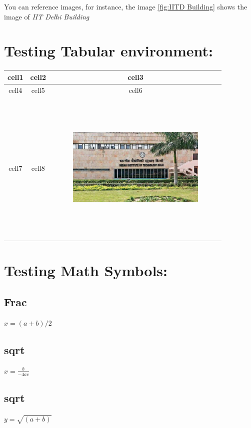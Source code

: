 \documentclass[sigconf]{acmart}
\begin{document}
You can reference images, for instance, the image \ref{fig:IITD Building} shows
the image of \textit{IIT Delhi Building}

\section{Testing Tabular environment:}

\begin{tabular}{ |c|c|c| }
 \hline
 cell1 & cell2 & cell3 \\
 \hline
 cell4 & cell5 & cell6 \\
 \hline
 cell7 & cell8 & \begin{figure}[h]
	\includegraphics[width=250,height=250]{iitd.jpg}
	\end{figure}
	 \\
 \hline
\end{tabular}

\section{Testing Math Symbols:}
\subsection{Frac} $x=(a+b)/2$
\subsection{sqrt} $x=\frac{b}{-4ac}$
\subsection{sqrt} $y=\sqrt{(a+b)}$
\end{document}
